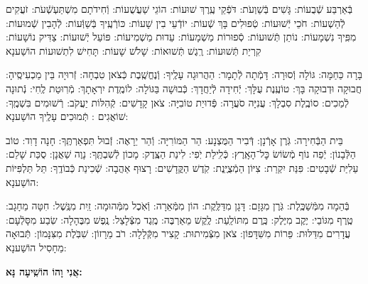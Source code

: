 \documentclass[twoside, openany, parskip=half, 11pt]{book}
\begin{document}
בְּֿאַרְבַּע שְֿׁבֻעוֹת: גָּשִׁים בְּֿשַׁוְעֹת: דֹּפְֿקֵי עֶֽרֶךְ שׁוּעוֹת: הוֹגֵי שַׁעֲשֻׁעוֹת: וְֿחִידֹתָם מִשְׁתַּעְשְֿׁעֹת: זֹעֲקִים לְֿהַשְׁעוֹת: חֹכֵי יְֿשׁוּעוֹת: טְֿפוּלִים בָּךְ שְֿׁעוֹת: יוֹדְֿעֵי בִין שָׁעוֹת: כּוֹרְֿעֶֽיךָ בְּֿשַׁוְּֿעוֹת: לְֿהָבִין שְֿׁמוּעוֹת: מִפִּֽיךָ נִשְׁמָעוֹת: נוֹתֵן תְּֿשׁוּעוֹת: סְֿפוּרוֹת מַשְׁמָעוֹת: עֵדוּת מַשְׁמִיעוֹת: פּוֹעֵל יְֿשׁוּעוֹת: צַדִּיק נוֹשָׁעוֹת: קִרְיַת תְּֿשׁוּעוֹת: רֶֽגֶשׁ תְּֿשׁוּאוֹת:
שָׁלֹשׁ שָׁעוֹת:
תָּחִישׁ לִתְשׁוּעוֹת הוֹשַׁענָא



בָּרָה כַּחַמָּה: גּוֹלָה וְֿסוּרָה: דָּמְֿתָה לְֿתָמָר: הַהֲרוּגָה עָלֶֽיךָ: וְֿנֶחֱשֶֽׁבֶת כְּֿצֹאן טִבְחָה: זְֿרוּיָה בֵּין מַכְעִיסֶֽיהָ: חֲבוּקָה וּדְבוּקָה בָּךְ: טוֹעֶֽנֶת עֻלָּךְ: יְֿחִידָה לְֿיַחֲדָךְ: כְּֿבוּשָׁה בַּגּוֹלָה: לוֹמֶֽדֶת יִרְאָתָךְ: מְֿרֽוּטַת לֶֽחִי: נְֿתוּנָה לְֿמַכִים: סוֹבֶֽלֶת סִבְלָךְ: עֲנִיָּה סֹעֲרָה: פְּֿדוּיַת טוֹבִיָּה: צֹאן קָדָשִׁים: קְֿהִלּוֹת יַעֲקֹב: רְֿשׁוּמִים בִּשְׁמֶֽךָ:
שׁוֹאֲגִים :
תְּֿמוּכִים עָלֶֽיךָ הוֹשַׁענָא:


בֵּית הַבְּֿחִירָה: גֹּֽרֶן אָרְֿנָן: דְּֿבִיר הַמֻּצְנָע: הַר הַמּוֹרִיָּה: וְֿהַר יֵרָאֶה: זְֿבוּל תִּפְאַרְתֶּֽךָ: חָנָה דָוִד: טוֹב הַלְּֿבָנוֹן: יְֿפֵה נוֹף מְֿשׂוֹשׂ כׇּל־הָאָֽרֶץ: כְּֿלִֽילַת יֹֽפִי: לִינַת הַצֶּֽדֶק: מָכוֹן לְֿשִׁבְתֶּֽךָ: נָוֶה שַׁאֲנָן: סֻכַּת שָׁלֵם: עַלִיַּת שְֿׁבָטִים: פִּנַּת יִקְרַת: צִיּוֹן הַמְֿצֻיֶּֽנֶת: קֹֽדֶשׁ הַקֳּדָשִׁים: רָצוּף אַהֲבָה:
שְֿׁכִינַת כְּֿבוֹדֶֽךָ:
תֵּל תַּלְפִּיּוֹת הוֹשַׁענָא:


בְּֿהֵמָה מִמְּֿשַׁכֶּֽלֶת: גֹּֽרֶן מִגָּזָם: דָּגָן מִדַּלֶּֽקֶת: הוֹן מִמְּֿאֵרָה: וְֿאֹֽכֶל מִמְּֿהוּמָה: זַֽיִת מִנֶּֽשֶׁל: חִטָּה מֵחָגָב: טֶֽרֶף מִגּוֹבַי: יֶקֶב מִיֶּלֶק: כֶּֽרֶם מִתּוֹלַֽעַת: לֶֽקֶשׁ מֵאַרְבֶּה: מֶֽגֶד מִצְּֿלָצַל: נֶֽפֶשׁ מִבֶּהָלָה: שֽׂבַע מִסָּלְֿעָם: עֲדָרִים מִדַּלּוּת: פֵּרוֹת מִשִּׁדָּפוֹן: צֹאן מִצְּֿמִיתוּת: קָצִיר מִקְּֿלָלָה: רֹב מֵרָזוֹן:
שִׁבֹּֽלֶת מִצִּנָּמוֹן:
תְּֿבוּאָה מֵחָסִיל הוֹשַׁענָא:


\label{ani vho}
\begin{large}
\textbf{אֲנִי וָהוֹ הוֹשִֽׁיעָה נָּא:}
\end{large}
\end{document}
